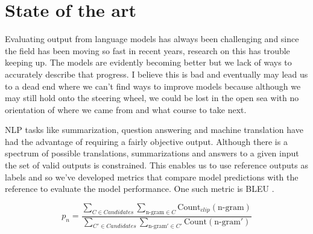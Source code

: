 \section{State of the art} \label{sec:body_state_of_the_art}
Evaluating output from language models has always been challenging and since the field has been moving so fast in recent years, research on this has trouble keeping up. The models are evidently becoming better but we lack of ways to accurately describe that progress. I believe this is bad and eventually may lead us to a dead end where we can't find ways to improve models because although we may still hold onto the steering wheel, we could be lost in the open sea with no orientation of where we came from and what course to take next. 

NLP tasks like summarization, question answering and machine translation have had the advantage of requiring a fairly objective output. Although there is a spectrum of possible translations, summarizations and answers to a given input the set of valid outputs is constrained. This enables us to use reference outputs as labels and so we've developed metrics that compare model predictions with the reference to evaluate the model performance. One such metric is BLEU \cite{papineni2002bleu}.  

\begin{equation}
p_n = \frac{\sum_{C \in Candidates} \sum_{\text{n-gram} \in C}\text{Count}_{clip}(\text{n-gram})}{\sum_{C' \in Candidates} \sum_{\text{n-gram}' \in C'}\text{Count}(\text{n-gram}')}
\end{equation}

